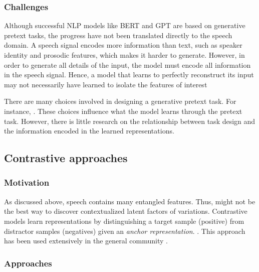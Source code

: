 \subsubsection{Challenges} 

Although successful NLP models like BERT and GPT are based on generative pretext tasks, the progress have not been translated directly to the speech domain. A speech signal encodes more information than text, such as speaker identity and prosodic features, which makes it harder to generate. However, in order to generate all details of the input, the model must encode all information in the speech signal. Hence, a model that learns to perfectly reconstruct its input may not necessarily have learned to isolate the features of interest  

There are many choices involved in designing a generative pretext task. For instance, . These choices influence what the model learns through the pretext task. However, there is little research on the relationship between task design and the information encoded in the learned representations.






\subsection{Contrastive approaches}
\label{contrastive_approaches}
\subsubsection{Motivation}
As discussed above, speech contains many entangled features. Thus,  might not be the best way to discover contextualized latent factors of variations. 
Contrastive models learn representations by distinguishing a target sample (positive) from distractor samples (negatives) given an \emph{anchor representation}. . This approach has been used extensively in the general  community \parencite{schultz_learning_2003}.

\subsubsection{Approaches}
